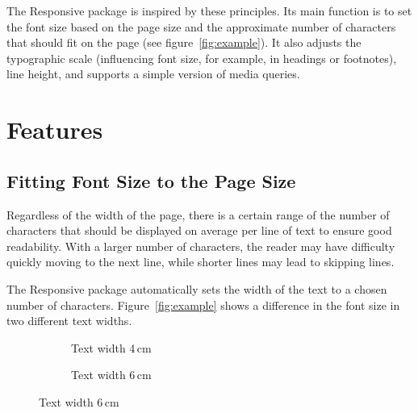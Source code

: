 \documentclass{ltxdoc}
\begin{document}
The Responsive package is inspired by these principles. Its main function
is to set the font size based on the page size and the approximate number of
characters that should fit on the page (see figure~\ref{fig:example}). It also adjusts the typographic scale
(influencing font size, for example, in headings or footnotes), line height,
and supports a simple version of media queries.


\section{Features}


\subsection{Fitting Font Size to the Page Size}

Regardless of the width of the page, there is a certain range of the number of
characters that should be displayed on average per line of text to ensure good
readability. With a larger number of characters, the reader may have difficulty
quickly moving to the next line, while shorter lines may lead to skipping
lines. 

The Responsive package automatically sets the width of the text to a chosen number of characters.
Figure~\ref{fig:example} shows a difference in the font size in two
different text widths.


\begin{figure}[htbp]
  \caption{Example of changing font size based on the width of the text block:}\label{fig:example}
\begin{subfigure}[t]{0.45\textwidth}
\fbox{%
\begin{minipage}{4cm}
\ResponsiveSetup{}
\setsizes{}

\lipsum[1]

\end{minipage}}
\caption{Text width 4\,cm}
\end{subfigure}
\begin{subfigure}[t]{0.45\textwidth}
\caption{Text width 6\,cm}
\end{subfigure}
\end{figure}
\end{document}
